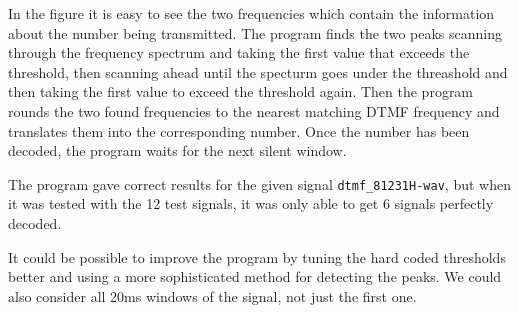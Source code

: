 In the figure it is easy to see the two frequencies which
contain the information about the number being transmitted.
The program finds the two peaks scanning through the frequency spectrum
and taking the first value that exceeds the threshold, then scanning
ahead until the specturm goes under the threashold and then taking the
first value to exceed the threshold again. Then the program rounds
the two found frequencies to the nearest matching  DTMF frequency and
translates them into the corresponding number. Once the number has been
decoded, the program waits for the next silent window.

The program gave correct results for the given signal
\verb|dtmf_81231H-wav|,
but when it was tested with the 12 test signals,
it was only able to get 6 signals perfectly decoded.

It could be possible to improve the program by tuning the
hard coded thresholds better and using a more sophisticated
method for detecting the peaks. We could also
consider all 20ms windows
of the signal, not just the first one.

